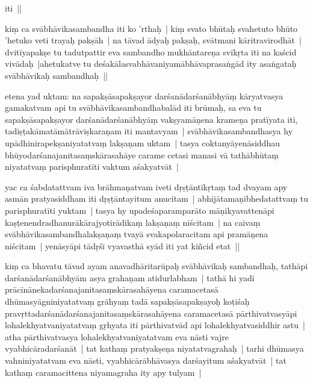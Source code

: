 \documentclass[article,12pt,a4paper]{memoir}
\newcommand{\add}[1]{($^{+}$#1)}
\newcommand{\deletion}[1]{($^{-}$#1)}
\begin{document}
	

	  \pstart iti ||
	\pend
      

	  \pstart kiṃ ca svābhāvikasambandha iti ko 'rthaḥ | kiṃ svato bhūtaḥ svahetuto bhūto 'hetuko veti trayaḥ pakṣāh | na tāvad ādyaḥ pakṣaḥ, svātmani kāritravirodhāt | dvitīyapakṣe tu tadutpattir eva sambandho mukhāntareṇa svīkṛta iti na kaścid vivādaḥ |ahetukatve tu deśakālasvabhāvaniyamābhāvaprasaṅgād ity asaṅgataḥ svābhāvikaḥ sambandhaḥ ||
	\pend
      

	  \pstart etena yad uktam: na sapakṣāsapakṣayor darśanādarśanābhyāṃ kāryatvasya gamakatvam api tu svābhāvikasambandhabalād iti brūmaḥ, sa eva tu sapakṣāsapakṣayor darśanādarśanābhyāṃ vakṣyamāṇena krameṇa pratīyata iti, tadiṣṭakāmatāmātrāviṣkaraṇam iti mantavyam | svābhāvikasambandhasya hy upādhinirapekṣaniyatatvaṃ lakṣaṇam uktam | tasya coktanyāyenāsiddhau bhūyodarśanajanitasaṃskārasahāye carame cetasi manasi vā tathābhūtaṃ niyatatvaṃ parisphuratīti \edtext{sahṛdayena}{\Afootnote{sa\deletion{ha}\add{hṛ}dayena \cite{RNAms} ; sadayena \cite{thakur75}   {\rmlatinfont [App type: var]}}} vaktum aśakyatvāt |
	\pend
      

	  \pstart yac ca śabdatattvam iva brāhmaṇatvam iveti dṛṣṭāntīkṛtaṃ tad dvayam apy asmān pratyasiddham iti dṛṣṭāntayitum anucitam | abhijātamaṇibhedatattvaṃ tu parisphuratīti yuktam | tasya hy upadeśaparamparāto māṇikyavattenāpi kaṣṭenendradhanurākārajyotirādikaṃ lakṣaṇaṃ niścitam | na caivaṃ svābhāvikasambandhalakṣaṇaṃ tvayā svakapolaracitam api pramāṇena niścitam | yenāsyāpi tādṛśī vyavasthā syād iti yat kiñcid etat ||
	\pend
      

	  \pstart kiṃ ca bhavatu tāvad ayam anavadhāritarūpaḥ svābhāvikaḥ sambandhaḥ, tathāpi darśanādarśanābhyām asya grahaṇam atidurlabham | tathā hi yadi prācīnānekadarśanajanitasaṃskārasahāyena caramacetasā dhūmasyāgniniyatatvaṃ grāhyaṃ tadā sapakṣāsapakṣayoḥ koṭiśaḥ pravṛttadarśanādarśanajanitasaṃskārasahāyena caramacetasā pārthivatvasyāpi lohalekhyatvaniyatatvaṃ gṛhyata iti pārthivatvād api lohalekhyatvasiddhir astu | atha pārthivatvasya lohalekhyatvaniyatatvam eva nāsti vajre vyabhicāradarśanāt | tat kathaṃ pratyakṣeṇa niyatatvagrahaḥ | tarhi dhūmasya vahniniyatatvam eva nāsti, vyabhicārābhāvasya darśayitum aśakyatvāt | tat kathaṃ caramacittena niyamagraha ity apy tulyam |
	\pend
      
\end{document}
